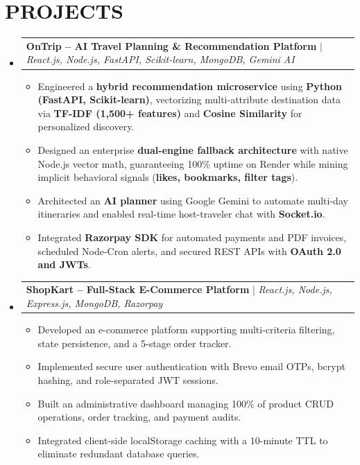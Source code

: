 \documentclass[letterpaper,10.5pt]{article}
\makeatletter
\newcommand{\resumeItem}[1]{
  \item\small{
    {#1 \vspace{-1.5pt}}
  }
}
\newcommand{\resumeProjectHeading}[2]{
  \vspace{-1.5pt}\item
    \begin{tabular*}{0.99\textwidth}[t]{l@{\extracolsep{\fill}}r}
      \small#1 & #2 \\
    \end{tabular*}\vspace{-5pt}
}
\newcommand{\resumeSubHeadingListStart}{\begin{itemize}[leftmargin=0.15in, label={}]}
\newcommand{\resumeSubHeadingListEnd}{\end{itemize}}
\newcommand{\resumeItemListStart}{\begin{itemize}[leftmargin=0.15in, itemsep=1.5pt, parsep=0pt, topsep=1.5pt]}
\newcommand{\resumeItemListEnd}{\end{itemize}\vspace{-4pt}}
\makeatother
\begin{document}
\section{PROJECTS}
    \resumeSubHeadingListStart
      \resumeProjectHeading
          {\textbf{OnTrip -- AI Travel Planning \& Recommendation Platform} $|$ \emph{React.js, Node.js, FastAPI, Scikit-learn, MongoDB, Gemini AI}}
          {\href{https://ontrip.onrender.com}{\faExternalLinkAlt} \hspace{2pt} \href{https://github.com/prashik24/OnTrip}{\faGithub}}
          \resumeItemListStart
            \resumeItem{Engineered a \textbf{hybrid recommendation microservice} using \textbf{Python (FastAPI, Scikit-learn)}, vectorizing multi-attribute destination data via \textbf{TF-IDF (1,500+ features)} and \textbf{Cosine Similarity} for personalized discovery.}
            \resumeItem{Designed an enterprise \textbf{dual-engine fallback architecture} with native Node.js vector math, guaranteeing 100\% uptime on Render while mining implicit behavioral signals (\textbf{likes, bookmarks, filter tags}).}
            \resumeItem{Architected an \textbf{AI planner} using Google Gemini to automate multi-day itineraries and enabled real-time host-traveler chat with \textbf{Socket.io}.}
            \resumeItem{Integrated \textbf{Razorpay SDK} for automated payments and PDF invoices, scheduled Node-Cron alerts, and secured REST APIs with \textbf{OAuth 2.0 and JWTs}.}
          \resumeItemListEnd

      \resumeProjectHeading
          {\textbf{ShopKart -- Full-Stack E-Commerce Platform} $|$ \emph{React.js, Node.js, Express.js, MongoDB, Razorpay}}
          {\href{https://github.com/prashik24}{\faExternalLinkAlt} \hspace{2pt} \href{https://github.com/prashik24}{\faGithub}}
          \resumeItemListStart
            \resumeItem{Developed an e-commerce platform supporting multi-criteria filtering, state persistence, and a 5-stage order tracker.}
            \resumeItem{Implemented secure user authentication with Brevo email OTPs, bcrypt hashing, and role-separated JWT sessions.}
            \resumeItem{Built an administrative dashboard managing 100\% of product CRUD operations, order tracking, and payment audits.}
            \resumeItem{Integrated client-side localStorage caching with a 10-minute TTL to eliminate redundant database queries.}
          \resumeItemListEnd
    \resumeSubHeadingListEnd

\end{document}
